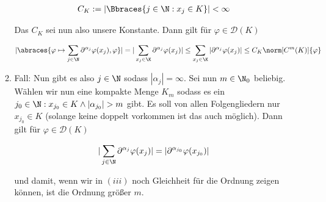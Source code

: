 \begin{solution}
\begin{enumerate}[label = (\roman*)]
\begin{enumerate}[label = \arabic*.]
    \begin{align*}
      C_K := |\Bbraces{j \in \N : x_j \in K}| < \infty
    \end{align*}

    Das $C_K$ sei nun also unsere Konstante. Dann gilt für $\varphi \in \mathcal{D}(K)$

    \begin{align*}
      |\abraces{\varphi \mapsto \sum_{j \in \N} \partial^{\alpha_j} \varphi(x_j), \varphi}|
      =
      |\sum_{x_j \in \K} \partial^{\alpha_j} \varphi(x_j)|
      \leq
      \sum_{x_j \in \K} |\partial^{\alpha_j} \varphi(x_j)|
      \leq
      C_K \norm[C^m(K)]{\varphi}
    \end{align*}

    \item Fall: Nun gibt es also $j \in \N$ sodass $|\alpha_j| = \infty$. Sei nun
    $m \in \N_0$ beliebig. Wählen wir nun eine kompakte Menge $K_m$ sodass es ein
    $j_0 \in \N: x_{j_0} \in K \land |\alpha_{j_0}| > m$ gibt. Es soll von allen Folgengliedern
    nur $x_{j_0} \in K$ (solange keine doppelt vorkommen ist das auch möglich). Dann gilt für
    $\varphi \in \mathcal{D}(K)$

    \begin{align*}
      |\sum_{j \in \N} \partial^{\alpha_j} \varphi(x_j)|
      =
      |\partial^{\alpha_{j_0}} \varphi(x_{j_0})|
    \end{align*}

    und damit, wenn wir in $(iii)$ noch Gleichheit für die Ordnung zeigen können,
    ist die Ordnung größer $m$.

  \end{enumerate}
\end{enumerate}

\end{solution}

